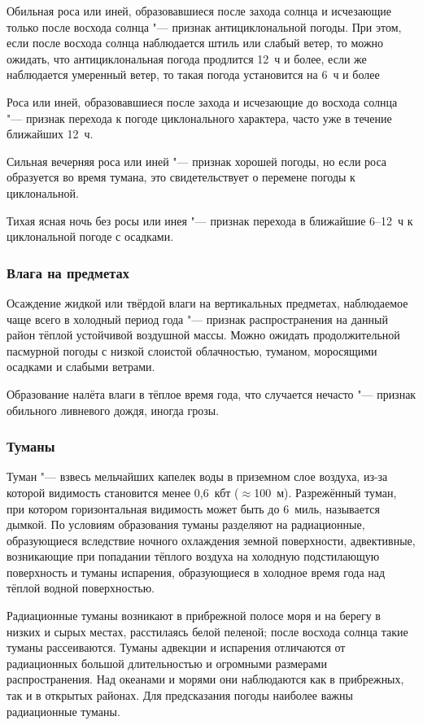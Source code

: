  Обильная роса или иней, образовавшиеся после захода солнца и
исчезающие только после восхода солнца "--- признак антициклональной
погоды. При этом, если после восхода солнца наблюдается штиль или
слабый ветер, то можно ожидать, что антициклональная погода продлится
12~ч и более, если же наблюдается умеренный ветер, то такая погода
установится на 6~ч и более

 Роса или иней, образовавшиеся после захода и исчезающие до
восхода солнца "--- признак перехода к погоде циклонального характера,
часто уже в течение ближайших 12~ч.

 Сильная вечерняя роса или иней "--- признак хорошей погоды, но
если роса образуется во время тумана, это свидетельствует о перемене
погоды к циклональной.

 Тихая ясная ночь без росы или инея "--- признак перехода в ближайшие
6--12~ч к циклональной погоде с осадками.

\subsubsection{Влага на предметах}

 Осаждение жидкой или твёрдой влаги на вертикальных предметах,
наблюдаемое чаще всего в холодный период года "--- признак
распространения на данный район тёплой устойчивой воздушной массы.
Можно ожидать продолжительной пасмурной погоды с низкой слоистой
облачностью, туманом, моросящими осадками и слабыми ветрами.

 Образование налёта влаги в тёплое время года, что случается
нечасто "--- признак обильного ливневого дождя, иногда грозы.

\subsubsection{Туманы}

Туман "--- взвесь мельчайших капелек воды в приземном слое воздуха,
из-за которой видимость становится менее 0,6~кбт
($\approx{}$100~м). Разрежённый туман, при котором горизонтальная
видимость может быть до 6~миль, называется дымкой. По условиям
образования туманы разделяют на радиационные, образующиеся вследствие
ночного охлаждения земной поверхности, адвективные, возникающие при
попадании тёплого воздуха на холодную подстилающую поверхность и
туманы испарения, образующиеся в холодное время года над тёплой водной
поверхностью.

Радиационные туманы возникают в прибрежной полосе моря и на берегу в
низких и сырых местах, расстилаясь белой пеленой; после восхода солнца
такие туманы рассеиваются. Туманы адвекции и испарения отличаются от
радиационных большой длительностью и огромными размерами
распространения. Над океанами и морями они наблюдаются как в
прибрежных, так и в открытых районах. Для предсказания погоды наиболее
важны радиационные туманы.

